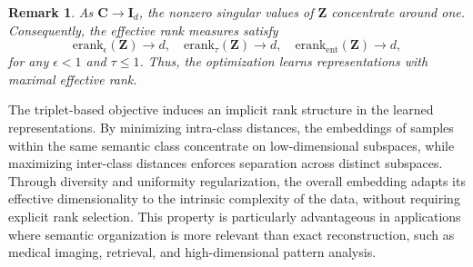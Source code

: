 \documentclass[a4paper,12pt,reqno]{amsart}
\newtheorem{remark}[theorem]{\textbf{Remark}}
\theoremstyle{definition}
\theoremstyle{remark}
\begin{document}
\begin{remark}
	As $\mathbf{C} \to \mathbf{I}_d$, the nonzero singular values of $\mathbf{Z}$ concentrate around one. 
	Consequently, the effective rank measures satisfy
	\[
	\text{erank}_{\epsilon}(\mathbf{Z}) \to d, \quad
	\text{erank}_{\tau}(\mathbf{Z}) \to d, \quad
	\text{erank}_{\text{ent}}(\mathbf{Z}) \to d,
	\]
	for any $\epsilon < 1$ and $\tau \leq 1$. 
	Thus, the optimization learns representations with maximal effective rank.
\end{remark}
	The triplet-based objective induces an implicit rank structure in the learned representations.
	By minimizing intra-class distances, the embeddings of samples within the same semantic class concentrate on low-dimensional subspaces, while maximizing inter-class distances enforces separation across distinct subspaces.
	Through diversity and uniformity regularization, the overall embedding adapts its effective dimensionality to the intrinsic complexity of the data, without requiring explicit rank selection.
	This property is particularly advantageous in applications where semantic organization is more relevant than exact reconstruction, such as medical imaging, retrieval, and high-dimensional pattern analysis.
\end{document}
